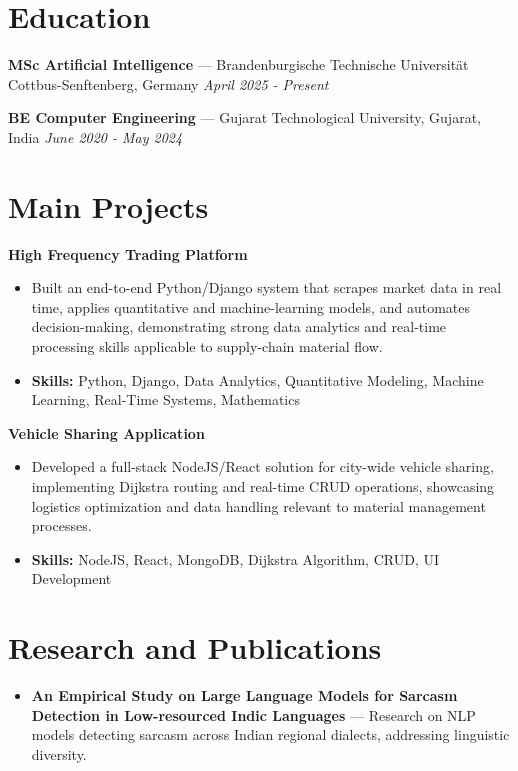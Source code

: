 \documentclass[a4paper,10pt]{article}
\begin{document}
\section*{Education}
\textbf{MSc Artificial Intelligence} — Brandenburgische Technische Universität Cottbus-Senftenberg, Germany \hfill \textit{April 2025 - Present}\par
\vspace{1.5pt}
\textbf{BE Computer Engineering} — Gujarat Technological University, Gujarat, India \hfill \textit{June 2020 - May 2024}\par

\section*{Main Projects}
\textbf{High Frequency Trading Platform}\par
\vspace{1pt}
\begin{itemize}
  \item Built an end-to-end Python/Django system that scrapes market data in real time, applies quantitative and machine-learning models, and automates decision-making, demonstrating strong data analytics and real-time processing skills applicable to supply-chain material flow.
  \item \textbf{Skills:} Python, Django, Data Analytics, Quantitative Modeling, Machine Learning, Real-Time Systems, Mathematics
\end{itemize}
\vspace{3pt}
\textbf{Vehicle Sharing Application}\par
\vspace{1pt}
\begin{itemize}
  \item Developed a full-stack NodeJS/React solution for city-wide vehicle sharing, implementing Dijkstra routing and real-time CRUD operations, showcasing logistics optimization and data handling relevant to material management processes.
  \item \textbf{Skills:} NodeJS, React, MongoDB, Dijkstra Algorithm, CRUD, UI Development
\end{itemize}

\section*{Research and Publications}
\begin{itemize}
\item \textbf{An Empirical Study on Large Language Models for Sarcasm Detection in Low-resourced Indic Languages} — Research on NLP models detecting sarcasm across Indian regional dialects, addressing linguistic diversity.
\end{itemize}
\end{document}
